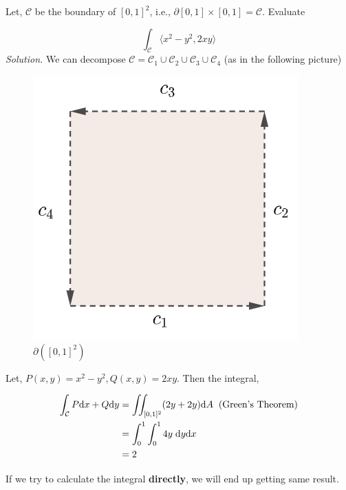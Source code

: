 \documentclass[../Analysis-3]{subfiles}
\begin{document}
\begin{Eg}{}{}
    Let, $\mathcal{C}$ be the boundary of $[0,1]^2$, i.e., $\partial [0,1]\times[0,1] = \mathcal{C}$. Evaluate

    \[\int_{\mathcal{C}} \langle x^2-y^2,2xy \rangle\]
    \textit{Solution.} We can decompose $\mathcal{C} = \mathcal{C}_1 \cup \mathcal{C}_2 \cup \mathcal{C}_3 \cup \mathcal{C}_4$ (as in the following picture)

    \begin{figure}
        \centering
        \includegraphics[width=.78\linewidth]{../figures/lec-28.2.png}
        \caption{$\partial( [0,1]^2)$}
    \end{figure}

    Let, $P(x,y) = x^2 - y^2, Q(x,y) = 2xy$. Then the integral,

    \begin{align*}
        \int_{\mathcal{C}} P \dd x + Q \dd y & = \iint_{[0,1]^2} (2y + 2y) \dd A \hspace{0.2cm} \text{(Green's Theorem)} \\
                                             & = \int_{0}^1 \int_0^1 4y \hspace{0.1cm} \dd y \dd x                       \\
                                             & = 2
    \end{align*}

    If we try to calculate the integral \textbf{directly}, we will end up getting same result.
\end{Eg}
\end{document}
